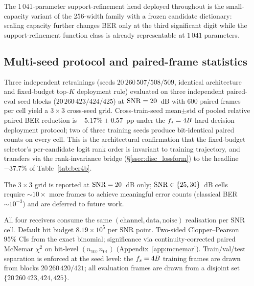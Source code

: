 The 1\,041-parameter support-refinement head deployed throughout is the
small-capacity variant of the 256-width family with a frozen candidate
dictionary: scaling capacity further changes BER only at the third
significant digit while the support-refinement function class is
already representable at 1\,041 parameters.

\subsection{Multi-seed protocol and paired-frame statistics}
\label{ssec:multiseed}
Three independent retrainings (seeds $20\,260\,507/508/509$, identical
architecture and fixed-budget top-$K$ deployment rule) evaluated on three
independent paired-eval seed blocks ($20\,260\,423/424/425$) at
$\mathrm{SNR}=20$~dB with 600 paired frames per cell yield a $3{\times}3$
cross-seed grid. Cross-train-seed mean$\pm$std of pooled relative
paired BER reduction is $-5.17\%\pm 0.57$~pp under
the $f_s=4B$ hard-decision deployment protocol; two of three training seeds produce
bit-identical paired counts on every cell. This is the architectural
confirmation that the fixed-budget selector's per-candidate logit rank order is
invariant to training trajectory, and transfers via the rank-invariance
bridge (\S\ref{ssec:disc_lossform}) to the headline $-37.7\%$ of
Table~\ref{tab:ber4b}.

The $3{\times}3$ grid is reported at $\mathrm{SNR}=20$~dB only; $\mathrm{SNR}\in\{25,30\}$~dB
cells require $\sim\!10{\times}$ more frames to achieve meaningful error counts
(classical BER $\sim\!10^{-3}$) and are deferred to future work.

All four receivers consume the same $(\text{channel},\text{data},\text{noise})$
realisation per SNR cell. Default bit budget $8.19\!\times\!10^{5}$ per
SNR point. Two-sided Clopper--Pearson 95\% CIs from the exact
binomial; significance via continuity-corrected paired McNemar
$\chi^2$ on bit-level $(n_{10},n_{01})$ (Appendix~\ref{app:mcnemar}).
Train/val/test separation is enforced at the seed level: the $f_s=4B$
training frames are drawn from blocks $20\,260\,420/421$; all evaluation frames
are drawn from a disjoint set $\{20\,260\,423,424,425\}$.
